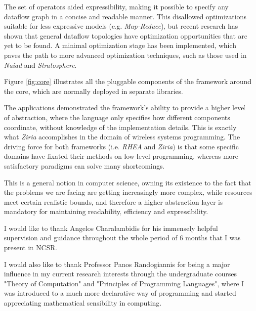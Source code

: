 \documentclass[sigplan,review,anonymous]{acmart}\settopmatter{printfolios=true}
\begin{document}
The set of operators aided expressibility, making it possible to specify any dataflow graph in a concise and readable manner. This disallowed optimizations suitable for less expressive models (e.g. \textit{Map-Reduce}), but recent research has shown that general dataflow topologies have optimization opportunities that are yet to be found\cite{blackbox}. A minimal optimization stage has been implemented, which paves the path to more advanced optimization techniques, such as those used in \textit{Naiad}\cite{naiad} and \textit{Stratosphere}\cite{static_analysis}.

Figure \ref{fig:core} illustrates all the pluggable components of the framework around the core, which are normally deployed in separate libraries.


The applications demonstrated the framework's ability to provide a higher level of abstraction, where the language only specifies how different components coordinate, without knowledge of the implementation details. This is exactly what \textit{Ziria} accomplishes in the domain of wireless systems programming\cite{ziria}. The driving force for both frameworks (i.e. \textit{RHEA} and \textit{Ziria}) is that some specific domains have fixated their methods on low-level programming, whereas more satisfactory paradigms can solve many shortcomings.

This is a general notion in computer science, owning its existence to the fact that the problems we are facing are getting increasingly more complex, while resources meet certain realistic bounds, and therefore a higher abstraction layer is mandatory for maintaining readability, efficiency and expressibility.


\begin{acks}                            %
I would like to thank Angelos Charalambidis for his immensely helpful supervision and guidance throughout the whole period of 6 months that I was present in NCSR. 

I would also like to thank Professor Panos Randogiannis for being a major influence in my current research interests through the undergraduate courses "Theory of Computation" and "Principles of Programming Languages", where I was introduced to a much more declarative way of programming and started appreciating mathematical sensibility in computing.
\end{acks}



\end{document}
